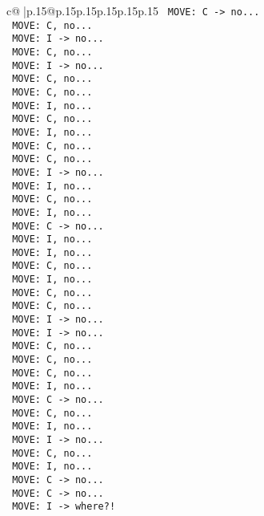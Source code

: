 \documentclass{article}
\begin{document}
{\begin{supertabular}{c@{$\;$}|p{.15\linewidth}@{}p{.15\linewidth}p{.15\linewidth}p{.15\linewidth}p{.15\linewidth}p{.15\linewidth}}
{{{\texttt{ MOVE: C {-}> no...} \\
\texttt{ MOVE: C, no...} \\
\texttt{ MOVE: I {-}> no...} \\
\texttt{ MOVE: C, no...} \\
\texttt{ MOVE: I {-}> no...} \\
\texttt{ MOVE: C, no...} \\
\texttt{ MOVE: C, no...} \\
\texttt{ MOVE: I, no...} \\
\texttt{ MOVE: C, no...} \\
\texttt{ MOVE: I, no...} \\
\texttt{ MOVE: C, no...} \\
\texttt{ MOVE: C, no...} \\
\texttt{ MOVE: I {-}> no...} \\
\texttt{ MOVE: I, no...} \\
\texttt{ MOVE: C, no...} \\
\texttt{ MOVE: I, no...} \\
\texttt{ MOVE: C {-}> no...} \\
\texttt{ MOVE: I, no...} \\
\texttt{ MOVE: I, no...} \\
\texttt{ MOVE: C, no...} \\
\texttt{ MOVE: I, no...} \\
\texttt{ MOVE: C, no...} \\
\texttt{ MOVE: C, no...} \\
\texttt{ MOVE: I {-}> no...} \\
\texttt{ MOVE: I {-}> no...} \\
\texttt{ MOVE: C, no...} \\
\texttt{ MOVE: C, no...} \\
\texttt{ MOVE: C, no...} \\
\texttt{ MOVE: I, no...} \\
\texttt{ MOVE: C {-}> no...} \\
\texttt{ MOVE: C, no...} \\
\texttt{ MOVE: I, no...} \\
\texttt{ MOVE: I {-}> no...} \\
\texttt{ MOVE: C, no...} \\
\texttt{ MOVE: I, no...} \\
\texttt{ MOVE: C {-}> no...} \\
\texttt{ MOVE: C {-}> no...} \\
\texttt{ MOVE: I {-}> where?!} \\
}}}
\end{supertabular}}
\end{document}
